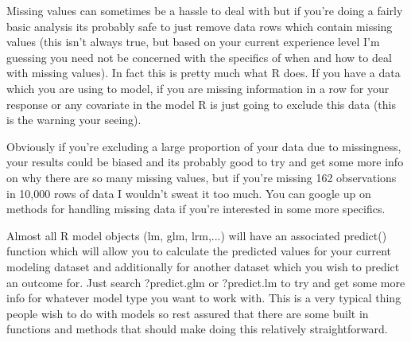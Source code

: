 \documentclass[00-GLMregslides.tex]{subfiles}
\begin{document}
\begin{frame}
Missing values can sometimes be a hassle to deal with but if you're doing a fairly basic analysis its probably safe to just remove data rows which contain missing values (this isn't always true, but based on your current experience level I'm guessing you need not be concerned with the specifics of when and how to deal with missing values). In fact this is pretty much what R does. If you have a data which you are using to model, if you are missing information in a row for your response or any covariate in the model R is just going to exclude this data (this is the warning your seeing). 
\end{frame}
\begin{frame}
Obviously if you're excluding a large proportion of your data due to missingness, your results could be biased and its probably good to try and get some more info on why there are so many missing values, but if you're missing 162 observations in 10,000 rows of data I wouldn't sweat it too much. You can google up on methods for handling missing data if you're interested in some more specifics.
\end{frame}
\begin{frame}
Almost all R model objects (lm, glm, lrm,...) will have an associated predict() function which will allow you to calculate the predicted values for your current modeling dataset and additionally for another dataset which you wish to predict an outcome for. Just search ?predict.glm or ?predict.lm to try and get some more info for whatever model type you want to work with. This is a very typical thing people wish to do with models so rest assured that there are some built in functions and methods that should make doing this relatively straightforward.

\end{frame}
	

\end{document}
